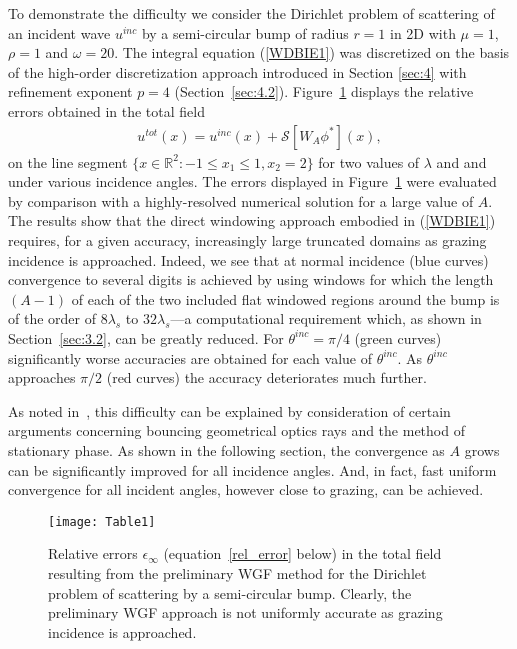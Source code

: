 \documentclass[10pt]{article}
\numberwithin{equation}{section}
\newcommand{\R}{{\mathbb R}}
\newcommand{\ben}{\begin{eqnarray*}}
\newcommand{\enn}{\end{eqnarray*}}
\begin{document}
To demonstrate the difficulty we consider the Dirichlet problem of
scattering of an incident wave $u^{inc}$ by a semi-circular bump of
radius $r=1$ in 2D with $\mu=1$, $\rho=1$ and $\omega=20$. The
integral equation (\ref{WDBIE1}) was discretized on the basis of the
high-order discretization approach introduced in Section \ref{sec:4}
with refinement exponent $p=4$
(Section~\ref{sec:4.2}). Figure~\ref{Table3.1.1} displays the relative
errors obtained in the total field \ben
u^{tot}(x)=u^{inc}(x)+\mathcal{S}[W_A\phi^*](x), \enn on the line
segment $\{x\in\R^2: -1\le x_1\le 1, x_2=2\}$ for two values of
$\lambda$ and and under various incidence angles. The errors displayed
in Figure~\ref{Table3.1.1} were evaluated by comparison with a
highly-resolved numerical solution for a large value of $A$.  The
results show that the direct windowing approach embodied in
(\ref{WDBIE1}) requires, for a given accuracy, increasingly large
truncated domains as grazing incidence is approached.  Indeed, we see
that at normal incidence (blue curves) convergence to several digits
is achieved by using windows for which the length $(A-1)$ of each of
the two included flat windowed regions around the bump is of the order
of $8\lambda_s$ to $32\lambda_s$---a computational requirement which,
as shown in Section~\ref{sec:3.2}, can be greatly reduced. For
$\theta^{inc}=\pi/4$ (green curves) significantly worse accuracies are
obtained for each value of $\theta^{inc}$. As $\theta^{inc}$
approaches $\pi/2$ (red curves) the accuracy deteriorates much
further.

As noted in~\cite{BLPT16}, this difficulty can be explained by
consideration of certain arguments concerning bouncing geometrical
optics rays and the method of stationary phase. As shown in the
following section, the convergence as $A$ grows can be significantly
improved for all incidence angles. And, in fact, fast uniform
convergence for all incident angles, however close to grazing, can be
achieved.


\begin{figure}[ht]
\centering
\texttt{[image: Table1]}
\caption{Relative errors $\epsilon_\infty$ (equation~\eqref{rel_error}
  below) in the total field resulting from the preliminary WGF method
  for the Dirichlet problem of scattering by a semi-circular
  bump. Clearly, the preliminary WGF approach is not uniformly
  accurate as grazing incidence is approached.}
\label{Table3.1.1}
\end{figure}
\end{document}
